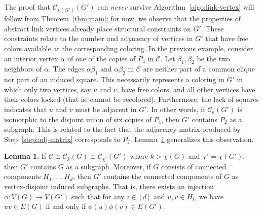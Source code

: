 \documentclass{amsart}
\theoremstyle{hypothesisstyle}
\theoremstyle{definition}
\newtheorem{lemma}[theorem]{Lemma}
\theoremstyle{remark}
\numberwithin{equation}{section}
\newcommand{\C}{\mathcal C}
\begin{document}
The proof that $\C_{\chi(G')}(G')$ can \emph{never} survive Algorithm~\ref{algo:link-vertex} will follow from Theorem~\ref{thm:main}; for now, we observe that the properties of abstract link vertices already place structural constraints on $G'$. These constraints relate to the number and adjacency of vertices in $G'$ that have free colors available at the corresponding coloring. In the previous example, consider an interior vertex $\alpha$ of one of the copies of $P_4$ in $\mathcal{C}$. Let $\beta_1, \beta_2$ be the two neighbors of $\alpha$. The edges $\alpha\beta_1$ and $\alpha\beta_2$ in $\mathcal{C}$ are neither part of a common clique nor part of an induced square. This necessarily represents a coloring in $G'$ in which only two vertices, say $u$ and $v$, have free colors, and all other vertices have their colors locked (that is, cannot be recolored). Furthermore, the lack of squares indicates that $u$ and $v$ must be adjacent in $G'$. In other words, if $\C_k(G')$ is isomorphic to the disjoint union of six copies of $P_4$, then $G'$ contains $P_2$ as a subgraph. This is related to the fact that the adjacency matrix produced by Step~\ref{step:adj-matrix} corresponds to $P_2$. Lemma~\ref{lem:subgraphs} generalizes this observation.

\begin{lemma}\label{lem:subgraphs}
    If $\C\cong \C_k(G)\cong \C_{\chi'}(G')$ where $k>\chi(G)$ and $\chi'=\chi(G')$, then $G'$ contains $G$ as a subgraph. Moreover, if $G$ consists of connected components $H_1,\dots,H_d$, then $G'$ contains the connected components of $G$ as vertex-disjoint induced subgraphs. That is, there exists an injection $\phi\colon V(G)\to V(G')$ such that for any $i\in[d]$ and $u,v\in H_i$, we have $uv\in E(G)$ if and only if $\phi(u)\phi(v)\in E(G')$. 
\end{lemma}
\end{document}
